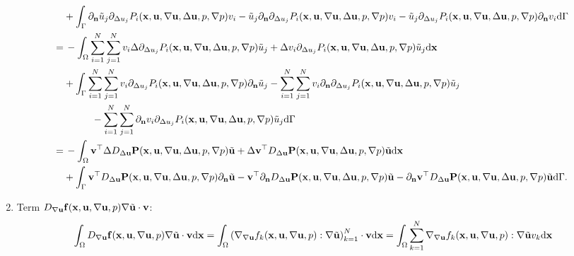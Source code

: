 \documentclass[oneside,11pt]{book}
\numberwithin{equation}{section}
\begin{document}
\begin{enumerate}[leftmargin=0in]
\begin{align*}
        &+ \int_\Gamma \partial_{\bf n}\tilde{u}_j\partial_{\Delta u_j}P_i({\bf x},{\bf u},\nabla{\bf u},\Delta{\bf u},p,\nabla p)v_i - \tilde{u}_j\partial_{\bf n}\partial_{\Delta u_j}P_i({\bf x},{\bf u},\nabla{\bf u},\Delta{\bf u},p,\nabla p)v_i - \tilde{u}_j\partial_{\Delta u_j}P_i({\bf x},{\bf u},\nabla{\bf u},\Delta{\bf u},p,\nabla p)\partial_{\bf n}v_i{\rm d}\Gamma\\
        =&\, -\int_\Omega \sum_{i=1}^N\sum_{j=1}^N v_i\Delta\partial_{\Delta u_j}P_i({\bf x},{\bf u},\nabla{\bf u},\Delta{\bf u},p,\nabla p)\tilde{u}_j + \Delta v_i\partial_{\Delta u_j}P_i({\bf x},{\bf u},\nabla{\bf u},\Delta{\bf u},p,\nabla p)\tilde{u}_j{\rm d}{\bf x}\\
        &+ \int_\Gamma \sum_{i=1}^N\sum_{j=1}^N v_i\partial_{\Delta u_j}P_i({\bf x},{\bf u},\nabla{\bf u},\Delta{\bf u},p,\nabla p)\partial_{\bf n}\tilde{u}_j - \sum_{i=1}^N\sum_{j=1}^N v_i\partial_{\bf n}\partial_{\Delta u_j}P_i({\bf x},{\bf u},\nabla{\bf u},\Delta{\bf u},p,\nabla p)\tilde{u}_j\\
        &\hspace{1cm} - \sum_{i=1}^N\sum_{j=1}^N \partial_{\bf n}v_i\partial_{\Delta u_j}P_i({\bf x},{\bf u},\nabla{\bf u},\Delta{\bf u},p,\nabla p)\tilde{u}_j{\rm d}\Gamma\\
        =&\, -\int_\Omega {\bf v}^\top\Delta D_{\Delta{\bf u}}{\bf P}({\bf x},{\bf u},\nabla{\bf u},\Delta{\bf u},p,\nabla p)\tilde{\bf u} + \Delta{\bf v}^\top D_{\Delta{\bf u}}{\bf P}({\bf x},{\bf u},\nabla{\bf u},\Delta{\bf u},p,\nabla p)\tilde{\bf u}{\rm d}{\bf x}\\
        &+ \int_\Gamma {\bf v}^\top D_{\Delta{\bf u}}{\bf P}({\bf x},{\bf u},\nabla{\bf u},\Delta{\bf u},p,\nabla p)\partial_{\bf n}\tilde{\bf u} - {\bf v}^\top\partial_{\bf n}D_{\Delta{\bf u}}{\bf P}({\bf x},{\bf u},\nabla{\bf u},\Delta{\bf u},p,\nabla p)\tilde{\bf u} - \partial_{\bf n}{\bf v}^\top D_{\Delta{\bf u}}{\bf P}({\bf x},{\bf u},\nabla{\bf u},\Delta{\bf u},p,\nabla p)\tilde{\bf u}{\rm d}\Gamma.
    \end{align*}
    \item Term $D_{\nabla{\bf u}}{\bf f}({\bf x},{\bf u},\nabla{\bf u},p)\nabla\tilde{\bf u}\cdot{\bf v}$:
    \begin{align*}
        &\int_\Omega D_{\nabla{\bf u}}{\bf f}({\bf x},{\bf u},\nabla{\bf u},p)\nabla\tilde{\bf u}\cdot{\bf v}{\rm d}{\bf x} = \int_\Omega \left(\nabla_{\nabla{\bf u}}f_k({\bf x},{\bf u},\nabla{\bf u},p):\nabla\tilde{\bf u}\right)_{k=1}^N\cdot{\bf v}{\rm d}{\bf x} = \int_\Omega \sum_{k=1}^N \nabla_{\nabla{\bf u}}f_k({\bf x},{\bf u},\nabla{\bf u},p):\nabla\tilde{\bf u}v_k{\rm d}{\bf x}\\

\end{align*}
\end{enumerate}
\end{document}

